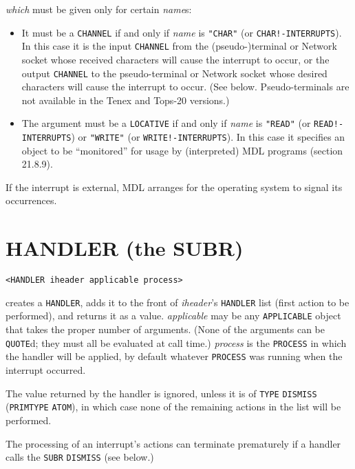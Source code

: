 \documentclass[a4paper]{scrbook}
\providecommand{\tightlist}{%
  \setlength{\itemsep}{0pt}\setlength{\parskip}{0pt}}
\begin{document}
\emph{which} must be given only for certain \emph{name}s:

\begin{itemize}
\tightlist
\item
  It must be a \texttt{CHANNEL} if and only if \emph{name} is \texttt{"CHAR"} (or \texttt{CHAR!-INTERRUPTS}). In this case
  it is the input \texttt{CHANNEL} from the (pseudo-)terminal or Network socket whose received characters will cause the
  interrupt to occur, or the output \texttt{CHANNEL} to the pseudo-terminal or Network socket whose desired characters will
  cause the interrupt to occur. (See below. Pseudo-terminals are not available in the Tenex and
  Tops-20 versions.)
\item
  The argument must be a \texttt{LOCATIVE} if and only if \emph{name} is \texttt{"READ"} (or \texttt{READ!-INTERRUPTS}) or
  \texttt{"WRITE"} (or \texttt{WRITE!-INTERRUPTS}). In this case it specifies an object to be ``monitored'' for usage by
  (interpreted) MDL programs (section 21.8.9).
\end{itemize}

If the interrupt is external, MDL arranges for the operating system to signal its occurrences.

\section{HANDLER (the SUBR)}\label{handler-the-subr}

\begin{verbatim}
<HANDLER iheader applicable process>
\end{verbatim}

 creates a \texttt{HANDLER}, adds it to the front of \emph{iheader}'s \texttt{HANDLER} list
(first action to be performed), and returns it as a value. \emph{applicable} may be any \texttt{APPLICABLE} object that
takes the proper number of arguments. (None of the arguments can be \texttt{QUOTE}d; they must all be evaluated at call
time.) \emph{process} is the \texttt{PROCESS} in which the handler will be applied, by default whatever \texttt{PROCESS}
was running when the interrupt occurred.

The value returned by the handler is ignored, unless it is of \texttt{TYPE} \texttt{DISMISS}
(\texttt{PRIMTYPE} \texttt{ATOM}), in which case none of the remaining actions in the list will be performed.

The processing of an interrupt's actions can terminate prematurely if a handler calls the \texttt{SUBR} \texttt{DISMISS}
(see below.)
\end{document}
